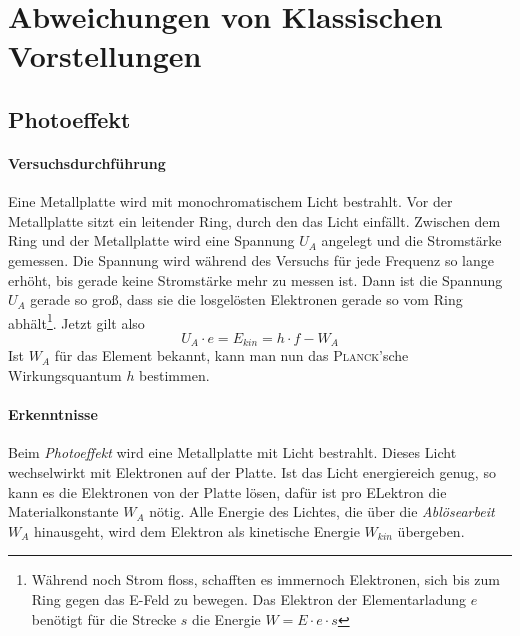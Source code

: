 \chapter{Abweichungen von Klassischen Vorstellungen}



\section{Photoeffekt}


\subsubsection{Versuchsdurchführung}


Eine Metallplatte wird mit monochromatischem Licht bestrahlt. Vor der Metallplatte sitzt ein leitender Ring, durch den das Licht einfällt. Zwischen dem Ring und der Metallplatte wird eine Spannung $U_A$ angelegt und die Stromstärke gemessen. Die Spannung wird während des Versuchs für jede Frequenz so lange erhöht, bis gerade keine Stromstärke mehr zu messen ist. Dann ist die Spannung $U_A$ gerade so groß, dass sie die losgelösten Elektronen gerade so vom Ring abhält\footnote{Während noch Strom floss, schafften es immernoch Elektronen, sich bis zum Ring gegen das E-Feld zu bewegen. Das Elektron der Elementarladung $e$ benötigt für die Strecke $s$ die Energie $W = E \cdot e \cdot s$}. Jetzt gilt also \begin{equation}
U_A \cdot e = E_{kin} = h \cdot f - W_A 
\end{equation}
Ist $W_A$ für das Element bekannt, kann man nun das \textsc{Planck}'sche Wirkungsquantum $h$ bestimmen.


	\subsubsection{Erkenntnisse}
	
Beim \emph{Photoeffekt} wird eine Metallplatte mit Licht bestrahlt. Dieses Licht wechselwirkt mit Elektronen auf der Platte. Ist das Licht energiereich genug, so kann es die Elektronen von der Platte lösen, dafür ist pro ELektron die Materialkonstante $W_A$ nötig. Alle Energie des Lichtes, die über die \emph{Ablösearbeit} $W_A$ hinausgeht, wird dem Elektron als kinetische Energie $W_{kin}$ übergeben.

